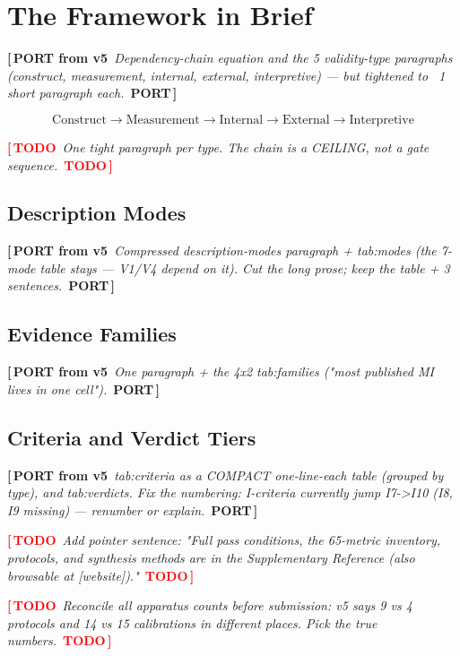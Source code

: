 \documentclass{article}
\newcommand{\TODO}[1]{\par\smallskip\noindent\textcolor{red}{\textbf{[\,TODO}}\ \textit{\textcolor{black!65}{#1}}\ \textcolor{red}{\textbf{TODO\,]}}\par\smallskip}
\newcommand{\PORT}[1]{\par\smallskip\noindent\textcolor{blue!65!black}{\textbf{[\,PORT from v5}}\ \textit{\textcolor{black!65}{#1}}\ \textcolor{blue!65!black}{\textbf{PORT\,]}}\par\smallskip}
\begin{document}
\section{The Framework in Brief}
\label{sec:framework}

\PORT{Dependency-chain equation and the 5 validity-type paragraphs (construct, measurement,
internal, external, interpretive) --- but tightened to ~1 short paragraph each.}
\begin{equation}
\text{Construct} \rightarrow \text{Measurement} \rightarrow \text{Internal} \rightarrow \text{External} \rightarrow \text{Interpretive}
\label{eq:dependency}
\end{equation}
\TODO{One tight paragraph per type. The chain is a CEILING, not a gate sequence.}

\subsection{Description Modes}
\PORT{Compressed description-modes paragraph + tab:modes (the 7-mode table stays --- V1/V4
depend on it). Cut the long prose; keep the table + 3 sentences.}

\subsection{Evidence Families}
\PORT{One paragraph + the 4x2 tab:families ("most published MI lives in one cell").}

\subsection{Criteria and Verdict Tiers}
\PORT{tab:criteria as a COMPACT one-line-each table (grouped by type), and tab:verdicts.
Fix the numbering: I-criteria currently jump I7->I10 (I8, I9 missing) --- renumber or explain.}
\TODO{Add pointer sentence: "Full pass conditions, the 65-metric inventory, protocols, and
synthesis methods are in the Supplementary Reference (also browsable at [website])."}
\TODO{Reconcile all apparatus counts before submission: v5 says 9 vs 4 protocols and
14 vs 15 calibrations in different places. Pick the true numbers.}
\end{document}
